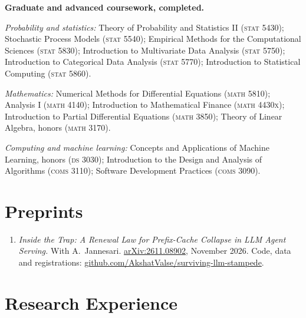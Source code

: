 \documentclass[11pt]{article}
\newcommand{\course}[2]{#1 (\textsc{#2})}
\begin{document}
\vspace{0.35em}
\noindent\textbf{Graduate and advanced coursework, completed.}\par
\vspace{0.15em}
\noindent\textit{Probability and statistics:}
\course{Theory of Probability and Statistics II}{stat 5430};
\course{Stochastic Process Models}{stat 5540};
\course{Empirical Methods for the Computational Sciences}{stat 5830};
\course{Introduction to Multivariate Data Analysis}{stat 5750};
\course{Introduction to Categorical Data Analysis}{stat 5770};
\course{Introduction to Statistical Computing}{stat 5860}.\par
\vspace{0.15em}
\noindent\textit{Mathematics:}
\course{Numerical Methods for Differential Equations}{math 5810};
\course{Analysis I}{math 4140};
\course{Introduction to Mathematical Finance}{math 4430x};
\course{Introduction to Partial Differential Equations}{math 3850};
\course{Theory of Linear Algebra, honors}{math 3170}.\par
\vspace{0.15em}
\noindent\textit{Computing and machine learning:}
\course{Concepts and Applications of Machine Learning, honors}{ds 3030};
\course{Introduction to the Design and Analysis of Algorithms}{coms 3110};
\course{Software Development Practices}{coms 3090}.

\section{Preprints}

\begin{enumerate}[leftmargin=1.4em,itemsep=0.4em,topsep=0.3em]
  \item \textit{Inside the Trap: A Renewal Law for Prefix-Cache Collapse in LLM Agent
    Serving.} With A.\ Jannesari.
    \href{https://arxiv.org/abs/2611.08902}{arXiv:2611.08902}, November 2026. Code, data
    and registrations:
    \href{https://github.com/AkshatValse/surviving-llm-stampede}{github.com/AkshatValse/surviving-llm-stampede}.
\end{enumerate}

\section{Research Experience}
\end{document}
